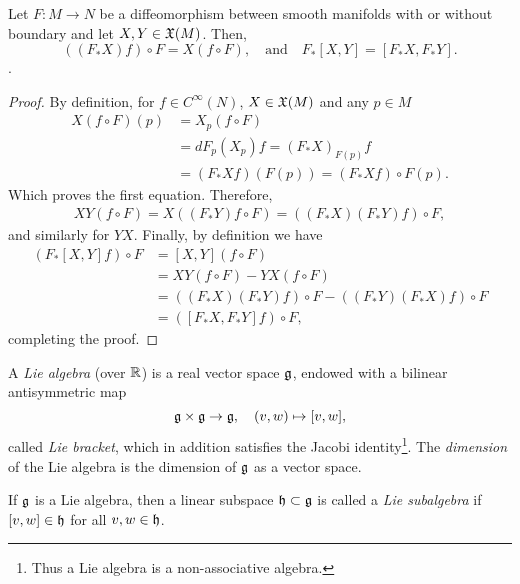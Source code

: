 \begin{theorem}\label{thm:liealgiso}
  Let $F:M\to N$ be a diffeomorphism between smooth manifolds with or without boundary and let $X, Y \in\mathfrak{X}(M)$. Then,
  \begin{equation}
    \left((F_* X)f\right)\circ F = X(f\circ F), \quad\mbox{and}\quad
    F_* [X,Y] = [F_* X, F_* Y].
  \end{equation}.
\end{theorem}
\begin{proof}
  By definition, for $f\in C^\infty(N)$, $X\in\mathfrak{X}(M)$ and any $p\in M$
  \begin{align}
    X(f\circ F)(p) &= X_p(f\circ F) \\
    &= dF_p(X_p)f = (F_* X)_{F(p)}f \\
    &= (F_*X f)(F(p)) = (F_*X f)\circ F(p).
  \end{align}
  Which proves the first equation.
  Therefore,
  \begin{align}
    X Y (f\circ F) = X ((F_* Y) f \circ F) 
    = ((F_* X) (F_* Y) f) \circ F,
  \end{align}
  and similarly for $Y X$.
  Finally, by definition we have
  \begin{align}
    (F_* [X,Y] f)\circ F
    &= [X,Y](f\circ F) \\
    &= XY (f\circ F) - YX (f\circ F) \\
    &= ((F_* X) (F_* Y)f)\circ F - ((F_* Y) (F_* X)f)\circ F\\
    &= ([F_* X, F_* Y]f)\circ F,
  \end{align}
  completing the proof.
\end{proof}

\begin{definition}\label{def:LieAlgebra}
  A \emph{Lie algebra} (over $\mathbb{R}$) is a real vector space $\mathfrak{g}$, endowed with a bilinear antisymmetric map
  \begin{equation}
    \mathfrak{g} \times \mathfrak{g} \to \mathfrak{g}, \quad (v,w)\mapsto [v,w],
  \end{equation}
  called \emph{Lie bracket}, which in addition satisfies the Jacobi identity\footnote{Thus a Lie algebra is a non-associative algebra.}. 
  The \emph{dimension} of the Lie algebra is the dimension of $\mathfrak{g}$ as a vector space.

  If $\mathfrak{g}$ is a Lie algebra, then a linear subspace $\mathfrak{h}\subset\mathfrak{g}$ is called a \emph{Lie subalgebra} if $[v,w]\in\mathfrak{h}$ for all $v,w\in\mathfrak{h}$.
\end{definition}

